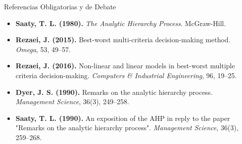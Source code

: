 \documentclass[aspectratio=169, 10pt]{beamer}
\begin{document}
\begin{frame}{Referencias Obligatorias y de Debate}
    \begin{itemize}
        \scriptsize
        \item \textbf{Saaty, T. L. (1980).} \textit{The Analytic Hierarchy Process}. McGraw-Hill.
        \item \textbf{Rezaei, J. (2015).} Best-worst multi-criteria decision-making method. \textit{Omega}, 53, 49--57.
        \item \textbf{Rezaei, J. (2016).} Non-linear and linear models in best-worst multiple criteria decision-making. \textit{Computers \& Industrial Engineering}, 96, 19--25.
        \item \textbf{Dyer, J. S. (1990).} Remarks on the analytic hierarchy process. \textit{Management Science}, 36(3), 249--258.
        \item \textbf{Saaty, T. L. (1990).} An exposition of the AHP in reply to the paper "Remarks on the analytic hierarchy process". \textit{Management Science}, 36(3), 259--268.
    \end{itemize}
\end{frame}
\end{document}
